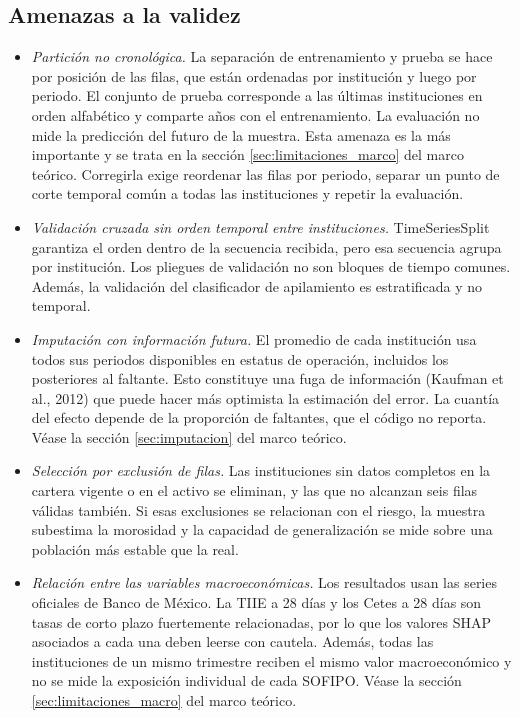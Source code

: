 \subsection{Amenazas a la validez}
\begin{itemize}
    \item \textit{Partición no cronológica.} La separación de entrenamiento y prueba se hace por posición de las filas, que están ordenadas por institución y luego por periodo. El conjunto de prueba corresponde a las últimas instituciones en orden alfabético y comparte años con el entrenamiento. La evaluación no mide la predicción del futuro de la muestra. Esta amenaza es la más importante y se trata en la sección \ref{sec:limitaciones_marco} del marco teórico. Corregirla exige reordenar las filas por periodo, separar un punto de corte temporal común a todas las instituciones y repetir la evaluación.

    \item \textit{Validación cruzada sin orden temporal entre instituciones.} TimeSeriesSplit garantiza el orden dentro de la secuencia recibida, pero esa secuencia agrupa por institución. Los pliegues de validación no son bloques de tiempo comunes. Además, la validación del clasificador de apilamiento es estratificada y no temporal.

    \item \textit{Imputación con información futura.} El promedio de cada institución usa todos sus periodos disponibles en estatus de operación, incluidos los posteriores al faltante. Esto constituye una fuga de información (Kaufman et al., 2012) que puede hacer más optimista la estimación del error. La cuantía del efecto depende de la proporción de faltantes, que el código no reporta. Véase la sección \ref{sec:imputacion} del marco teórico.

    \item \textit{Selección por exclusión de filas.} Las instituciones sin datos completos en la cartera vigente o en el activo se eliminan, y las que no alcanzan seis filas válidas también. Si esas exclusiones se relacionan con el riesgo, la muestra subestima la morosidad y la capacidad de generalización se mide sobre una población más estable que la real.

    \item \textit{Relación entre las variables macroeconómicas.} Los resultados usan las series oficiales de Banco de México. La TIIE a 28 días y los Cetes a 28 días son tasas de corto plazo fuertemente relacionadas, por lo que los valores SHAP asociados a cada una deben leerse con cautela. Además, todas las instituciones de un mismo trimestre reciben el mismo valor macroeconómico y no se mide la exposición individual de cada SOFIPO. Véase la sección \ref{sec:limitaciones_macro} del marco teórico.


\end{itemize}

